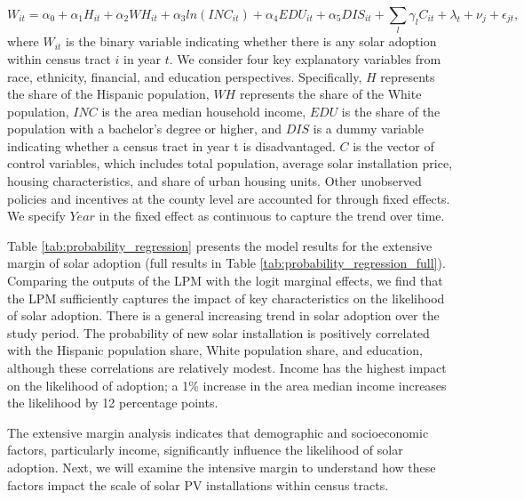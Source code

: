 \documentclass[12pt,twoside,letterpaper]{article}
\begin{document}
\begin{equation}\label{reg_1}
W_{it}= \alpha_{0} + \alpha_{1}H_{it} + \alpha_{2}WH_{it} + \alpha_{3}ln(INC_{it}) + \alpha_{4}EDU_{it} + \alpha_{5}DIS_{it} +\sum_{l}\gamma_{l}C_{it} + \lambda_{t} + \nu_{j} + \epsilon_{jt},
\end{equation}
where $W_{it}$ is the binary variable indicating whether there is any solar adoption within census tract $i$ in year $t$. We consider four key explanatory variables from race, ethnicity, financial, and education perspectives. Specifically, $H$ represents the share of the Hispanic population, $WH$ represents the share of the White population, $INC$ is the area median household income, $EDU$ is the share of the population with a bachelor's degree or higher, and $DIS$ is a dummy variable indicating whether a census tract in year t is disadvantaged. $C$ is the vector of control variables, which includes total population, average solar installation price, housing characteristics, and share of urban housing units. Other unobserved policies and incentives at the county level are accounted for through fixed effects. We specify $Year$ in the fixed effect as continuous to capture the trend over time.


Table \ref{tab:probability_regression} presents the model results for the extensive margin of solar adoption (full results in Table \ref{tab:probability_regression_full}). Comparing the outputs of the LPM with the logit marginal effects, we find that the LPM sufficiently captures the impact of key characteristics on the likelihood of solar adoption. There is a general increasing trend in solar adoption over the study period. The probability of new solar installation is positively correlated with the Hispanic population share, White population share, and education, although these correlations are relatively modest. Income has the highest impact on the likelihood of adoption; a 1\% increase in the area median income increases the likelihood by 12 percentage points. 

The extensive margin analysis indicates that demographic and socioeconomic factors, particularly income, significantly influence the likelihood of solar adoption. Next, we will examine the intensive margin to understand how these factors impact the scale of solar PV installations within census tracts.
\end{document}
